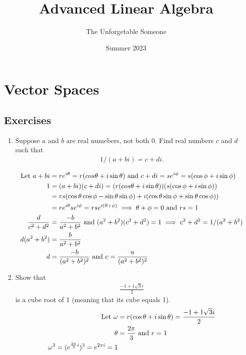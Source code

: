 \documentclass[10pt,a4paper]{report}
\title{Advanced Linear Algebra}
\author{The Unforgetable Someone}
\date{Summer 2023}
\newcommand{\BLUE}[1]{\textcolor{blue}{#1}}
\begin{document}
\maketitle

\tableofcontents

\chapter{Vector Spaces}
\section{Exercises}

\begin{enumerate}

\item Suppose $a$ and $b$ are real numebers, not both 0.  Find real numbers $c$ and $d$ such that
\begin{align*}
	1/(a+bi)=c+di.
\end{align*}

\BLUE{\begin{align*}
	\text{Let } a+bi&=re^{i\theta} = r(cos \theta + i\sin \theta) \text{ and } c+di=se^{i\phi} = s(\cos \phi + i \sin \phi)\\
	1 &= (a+bi)(c+di) = (r(cos \theta + i\sin \theta))(s(\cos \phi + i \sin \phi))\\
	&= rs(\cos\theta\cos\phi-\sin\theta\sin\phi)+i(\cos\theta\sin\phi+\sin\theta\cos\phi)) \\
	&= re^{i\theta}se^{i\phi} = rse^{i(\theta+\phi)} \implies \theta+\phi = 0 \text{ and } rs = 1\\
	\frac{d}{c^2+d^2} &= \frac{-b}{a^2+b^2} \text{ and } (a^2+b^2)(c^2+d^2) = 1 \implies c^2+d^2= 1/(a^2+b^2)\\
	d(a^2+b^2) &= \frac{b}{a^2+b^2} \\
	d &= \frac{-b}{(a^2+b^2)^2} \text{ and } c = \frac{a}{(a^2+b^2)^2}
\end{align*}
}

\item Show that 
\begin{align*}
\frac{-1+1\sqrt{3}i}{2}
\end{align*}is a cube root of 1 (meaning that its cube equals 1).
\begin{align*}
	\text{Let } \omega &= r(\cos \theta + i\sin\theta) = \frac{-1+1\sqrt{3}i}{2}\\
	\theta &= \frac{2\pi}{3} \text{ and } r=1 \\
	\omega^3 = (e^{\frac{2\pi}{3}i})^3 = e^{2\pi i} = 1
\end{align*}


\end{enumerate}
\end{document}
